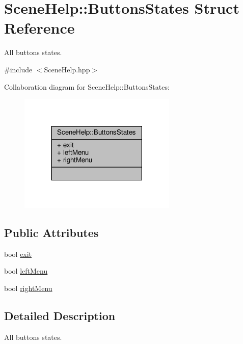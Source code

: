 \hypertarget{struct_scene_help_1_1_buttons_states}{}\section{Scene\+Help\+:\+:Buttons\+States Struct Reference}
\label{struct_scene_help_1_1_buttons_states}


All buttons states.  




{\ttfamily \#include $<$Scene\+Help.\+hpp$>$}



Collaboration diagram for Scene\+Help\+:\+:Buttons\+States\+:
\nopagebreak
\begin{figure}[H]
\begin{center}
\leavevmode
\includegraphics[width=213pt]{struct_scene_help_1_1_buttons_states__coll__graph}
\end{center}
\end{figure}
\subsection*{Public Attributes}
\begin{DoxyCompactItemize}
\item 
bool \hyperlink{struct_scene_help_1_1_buttons_states_acb4361e4df9c8dbc312ad05588920e85}{exit}
\item 
bool \hyperlink{struct_scene_help_1_1_buttons_states_a37662d8ee33a1543224e416cc5bb8312}{left\+Menu}
\item 
bool \hyperlink{struct_scene_help_1_1_buttons_states_a56142e769380a72a01bd9e84c9d98148}{right\+Menu}
\end{DoxyCompactItemize}


\subsection{Detailed Description}
All buttons states. 

